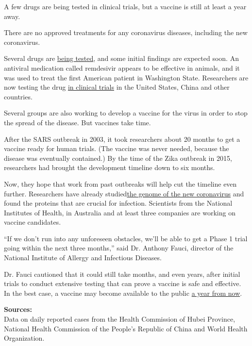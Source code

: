 A few drugs are being tested in clinical trials, but a vaccine is still
at least a year away.

There are no approved treatments for any coronavirus diseases, including
the new coronavirus.

Several drugs are
\href{https://www.nytimes3xbfgragh.onion/2020/02/06/health/coronavirus-treatments.html}{being
tested}, and some initial findings are expected soon. An antiviral
medication called remdesivir appears to be effective in animals, and it
was used to treat the first American patient in Washington State.
Researchers are now testing the drug
\href{https://www.nytimes3xbfgragh.onion/2020/02/26/health/coronavirus-gilead-drug-trials.html}{in
clinical trials} in the United States, China and other countries.

Several groups are also working to develop a vaccine for the virus in
order to stop the spread of the disease. But vaccines take time.

After the SARS outbreak in 2003, it took researchers about 20 months to
get a vaccine ready for human trials. (The vaccine was never needed,
because the disease was eventually contained.) By the time of the Zika
outbreak in 2015, researchers had brought the development timeline down
to six months.

Now, they hope that work from past outbreaks will help cut the timeline
even further. Researchers have already
studied\href{https://ncbiinsights.ncbi.nlm.nih.gov/2020/01/13/novel-coronavirus/}{}\href{https://ncbiinsights.ncbi.nlm.nih.gov/2020/01/13/novel-coronavirus/}{the
genome of the new coronavirus} and found the proteins that are crucial
for infection. Scientists from the National Institutes of Health, in
Australia and at least three companies are working on vaccine
candidates.

``If we don't run into any unforeseen obstacles, we'll be able to get a
Phase 1 trial going within the next three months,'' said Dr. Anthony
Fauci, director of the National Institute of Allergy and Infectious
Diseases.

Dr. Fauci cautioned that it could still take months, and even years,
after initial trials to conduct extensive testing that can prove a
vaccine is safe and effective. In the best case, a vaccine may become
available to the public
\href{https://www.nytimes3xbfgragh.onion/2020/01/28/health/coronavirus-vaccine.html}{a
year from now}.

\textbf{Sources:}\\
Data on daily reported cases from the Health Commission of Hubei
Province, National Health Commission of the People's Republic of China
and World Health Organization.

